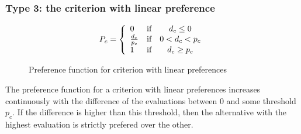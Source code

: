 \subsubsection{Type 3: the criterion with linear preference}
\begin{figure}[H]
\begin{minipage}{.5\textwidth}
    \begin{center}
    \end{center}
\end{minipage}%
\begin{minipage}{.5\textwidth}
    \begin{equation}
        P_c = \left\{
            \begin{array}{l c c}
                0               & \text{if}  & d_{c} \le 0 \\
                \frac{d_c}{p_c} & \text{if}  & 0 < d_c  < p_c \\
                1               & \text{if}  & d_{c} \ge p_c \\
            \end{array}
            \right .
            \label{eq:type3_criterion}
    \end{equation}
\end{minipage}
\caption{Preference function for criterion with linear preferences}
\end{figure}
The preference function for a criterion with linear preferences increases continuously with the difference of the evaluations between $0$ and some threshold $p_c$. If the difference is higher than this threshold, then the alternative with the highest evaluation is strictly prefered over the other.

